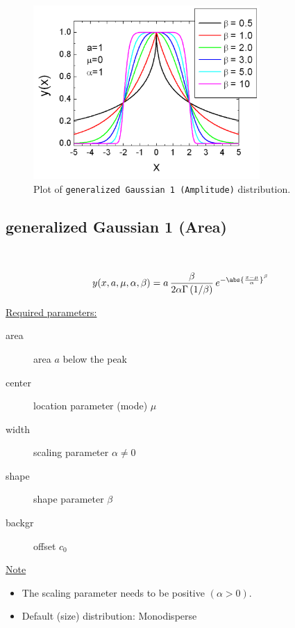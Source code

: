 \begin{figure}[htb]
\begin{center}
\includegraphics[width=0.768\textwidth]{generalizedGaussian1Amplitude.png}
\end{center}
\caption{Plot of \texttt{generalized Gaussian 1 (Amplitude)}
distribution.} \label{fig:generalizedGaussian1Amplitude}
\end{figure}

\clearpage
\subsection{generalized Gaussian 1 (Area)} ~\\
\label{sec:generalizedGaussian1Area}

\begin{align}
y(x,a,\mu,\alpha,\beta) = a\,
\frac{\beta}{2\alpha\Gamma\left(1/\beta\right)} \,
e^{-\abs{\frac{x-\mu}{\alpha}}^\beta}
\end{align}

\underline{Required parameters:}
\begin{description}
    \item[area] area $a$ below the peak
    \item[center] location parameter (mode) $\mu$
    \item[width] scaling parameter $\alpha \neq 0$
    \item[shape] shape parameter $\beta$
    \item[backgr] offset $c_0$
\end{description}

\underline{Note}
\begin{itemize}
  \item The scaling parameter needs to be positive $(\alpha > 0)$.
  \item Default (size) distribution: Monodisperse
\end{itemize}

